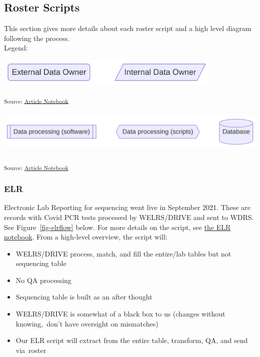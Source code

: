 \documentclass[
  letterpaper,
  DIV=11,
  numbers=noendperiod]{scrartcl}
\providecommand{\tightlist}{%
  \setlength{\itemsep}{0pt}\setlength{\parskip}{0pt}}\usepackage{longtable,booktabs,array}
\begin{document}
\subsection{Roster Scripts}\label{sec-ecosystem}

This section gives more details about each roster script and a high
level diagram following the process.\\

Legend:

\includegraphics[width=4.27in,height=0.51in]{index_files/figure-latex/mermaid-figure-18.png}

\textsubscript{Source:
\href{https://NW-PaGe.github.io/sequencing_integration_pipeline1.0/index.qmd.html}{Article
Notebook}}

\includegraphics[width=6.56in,height=0.82in]{index_files/figure-latex/mermaid-figure-17.png}

\textsubscript{Source:
\href{https://NW-PaGe.github.io/sequencing_integration_pipeline1.0/index.qmd.html}{Article
Notebook}}

\subsubsection{ELR}\label{sec-elr}

Electronic Lab Reporting for sequencing went live in September 2021.
These are records with Covid PCR tests processed by WELRS/DRIVE and sent
to WDRS\hspace{0pt}. See Figure~\ref{fig-elrflow} below. For more
details on the script, see \href{notebooks/elr.Rmd}{the ELR notebook}.
From a high-level overview, the script will:

\begin{itemize}
\tightlist
\item
  WELRS/DRIVE process, match, and fill the entire/lab tables but not
  sequencing table\hspace{0pt}
\item
  No QA processing\hspace{0pt}
\item
  Sequencing table is built as an after thought\hspace{0pt}
\item
  WELRS/DRIVE is somewhat of a black box to us (changes without
  knowing,~don't have oversight on mismatches)\hspace{0pt}
\item
  Our ELR script will extract from the entire table, transform, QA, and
  send via~roster\hspace{0pt}
\end{itemize}
\end{document}
